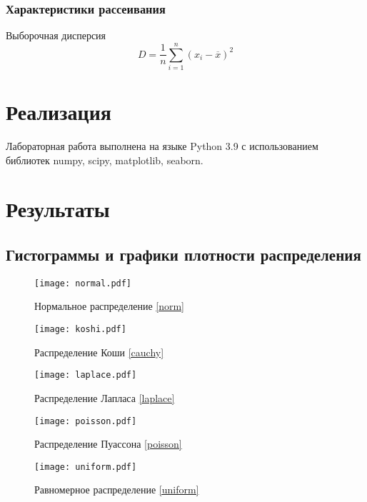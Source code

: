 \documentclass[a4paper,12pt]{article} %
\begin{document}
\subsubsection{Характеристики рассеивания}
Выборочная дисперсия
\begin{equation}\label{svar}
    D=\frac{1}{n}\sum_{i=1}^n \left(x_i-\overline{x}\right)^2
\end{equation}
\section{Реализация}
Лабораторная работа выполнена на языке Python 3.9 с использованием библиотек numpy, scipy, matplotlib, seaborn.
\section{Результаты}
\subsection{Гистограммы и графики плотности распределения}
\begin{figure}[H]
    \centering
    \texttt{[image: normal.pdf]}
    \caption{Нормальное распределение \eqref{norm}}
    \label{fig:norm}
\end{figure}
\begin{figure}[H]
    \centering
    \texttt{[image: koshi.pdf]}
    \caption{Распределение Коши \eqref{cauchy}}
    \label{fig:cauchy}
\end{figure}
\begin{figure}[H]
    \centering
    \texttt{[image: laplace.pdf]}
    \caption{Распределение Лапласа \eqref{laplace}}
    \label{fig:laplace}
\end{figure}
\begin{figure}[H]
    \centering
    \texttt{[image: poisson.pdf]}
    \caption{Распределение Пуассона \eqref{poisson}}
    \label{fig:poisson}
\end{figure}
\begin{figure}[H]
    \centering
    \texttt{[image: uniform.pdf]}
    \caption{Равномерное распределение \eqref{uniform}}
    \label{fig:uniform}
\end{figure}
\end{document}
